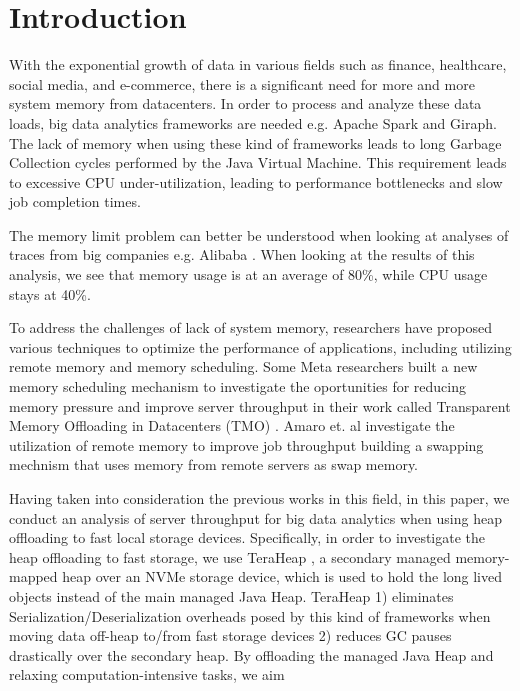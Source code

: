 \section{Introduction}
\label{sec:intro}

With the exponential growth of data in various fields such as finance,
healthcare, social media, and e-commerce, there is a significant need
for more and more system memory from datacenters. In order
to process and analyze these data loads, big data analytics frameworks
are needed e.g. Apache Spark \cite{Spark} and Giraph. 
The lack of memory when using these kind of frameworks leads to
long Garbage Collection cycles performed by the Java Virtual Machine.
This requirement leads to excessive CPU under-utilization, 
leading to performance bottlenecks and slow job completion
times.
\par The memory limit problem can better be understood when looking at analyses of traces from big companies e.g. Alibaba \cite{Alibaba}.
When looking at the results of this analysis, we see that memory usage is at an average of 80\%, while CPU usage stays at 40\%. 
\par To address the challenges of lack of system memory, researchers have proposed various
techniques to optimize the performance of applications, including
utilizing remote memory and memory scheduling.
Some Meta researchers built a new memory scheduling mechanism to investigate the oportunities
for reducing memory pressure and improve server throughput in their work called Transparent Memory Offloading in Datacenters (TMO)
\cite{TMO}. Amaro et. al investigate the utilization of remote memory to improve job throughput \cite{CFM} building a swapping mechnism that uses memory from remote servers as swap memory.
\par Having taken into consideration the previous works in this field,
in this paper, we conduct an analysis of server throughput for big data analytics when using heap offloading to fast local storage devices.
Specifically, in order to investigate the heap offloading to fast storage,
we use TeraHeap \cite{TeraHeap}, a secondary managed
memory-mapped heap over an NVMe storage device, which is used to hold
the long lived objects instead of the main
managed Java Heap.
TeraHeap 1) eliminates Serialization/Deserialization overheads posed
by this kind of frameworks when moving data off-heap to/from fast
storage devices 2) reduces GC pauses drastically over the secondary heap.
By offloading the managed Java Heap and relaxing computation-intensive tasks, we aim
